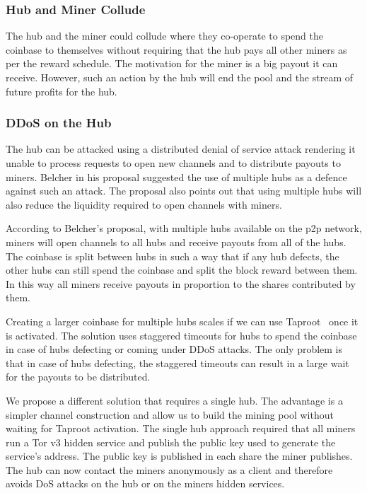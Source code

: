 \documentclass{article}
\begin{document}
\subsubsection{Hub and Miner Collude}\label{ref:collusion}

The hub and the miner could collude where they co-operate to spend the
coinbase to themselves without requiring that the hub pays all other
miners as per the reward schedule. The motivation for the miner is a
big payout it can receive. However, such an action by the hub will
end the pool and the stream of future profits for the hub.


\subsubsection{DDoS on the Hub}\label{ref:ddos-attack}

The hub can be attacked using a distributed denial of service attack
rendering it unable to process requests to open new channels and to
distribute payouts to miners. Belcher in his proposal suggested the
use of multiple hubs as a defence against such an attack. The proposal
also points out that using multiple hubs will also reduce the
liquidity required to open channels with miners.

According to Belcher's proposal, with multiple hubs available on the
p2p network, miners will open channels to all hubs and receive payouts
from all of the hubs. The coinbase is split between hubs in such a way
that if any hub defects, the other hubs can still spend the coinbase
and split the block reward between them. In this way all miners
receive payouts in proportion to the shares contributed by them.

Creating a larger coinbase for multiple hubs scales if we can use
Taproot~\cite{bip340,bip341, bip342} once it is activated. The
solution uses staggered timeouts for hubs to spend the coinbase in
case of hubs defecting or coming under DDoS attacks. The only problem
is that in case of hubs defecting, the staggered timeouts can result
in a large wait for the payouts to be distributed.

We propose a different solution that requires a single hub. The
advantage is a simpler channel construction and allow us to build the
mining pool without waiting for Taproot activation. The single hub
approach required that all miners run a Tor v3 hidden service and
publish the public key used to generate the service's address. The
public key is published in each share the miner publishes. The hub can
now contact the miners anonymously as a client and therefore avoids
DoS attacks on the hub or on the miners hidden services.
\end{document}
